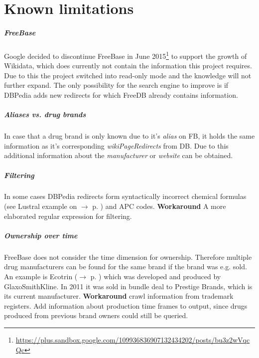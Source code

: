 \documentclass[11pt,titlepage,oneside,openany]{book}
\begin{document}
\label{ex:ecotrin}


\chapter{Known limitations}
\label{cha:limiations}



\paragraph{FreeBase}
\label{prob:freebase}
Google decided to discontinue FreeBase in June 2015\footnote{\url{https://plus.sandbox.google.com/109936836907132434202/posts/bu3z2wVqcQc}} to support the growth of Wikidata, which does currently not contain the information this project requires. Due to this the project switched into read-only mode and the knowledge will not further expand. The only possibility for the search engine to improve is if DBPedia adds new redirects for which FreeDB already contains information. 


\paragraph{Aliases vs. drug brands}
\label{limitations:fb_drugs} 
In case that a drug brand is only known due to it's \textit{alias} on FB, it holds the same information as it's corresponding \textit{wikiPageRedirects} from DB. Due to this additional information about the \textit{manufacturer} or \textit{website} can be obtained.


\paragraph{Filtering}
\label{limitations:filtering}
In some cases DBPedia redirects form syntactically incorrect chemical formulas (see Lustral example on $\rightarrow$ p. \pageref{example:lustral}) and APC codes. \textbf{Workaround} A more elaborated regular expression for filtering.

\paragraph{Ownership over time}
FreeBase does not consider the time dimension for ownership. Therefore multiple drug manufacturers can be found for the same brand if the brand was e.g. sold. An example is Ecotrin ($\rightarrow$ p. \pageref{ex:ecotrin}) which was developed and produced by GlaxoSmithKline. In 2011 it was sold in bundle deal to Prestige Brands, which is its current manufacturer.
\textbf{Workaround} crawl information from trademark registers. Add information about production time frames to output, since drugs produced from previous brand owners could still be queried.
\end{document}
